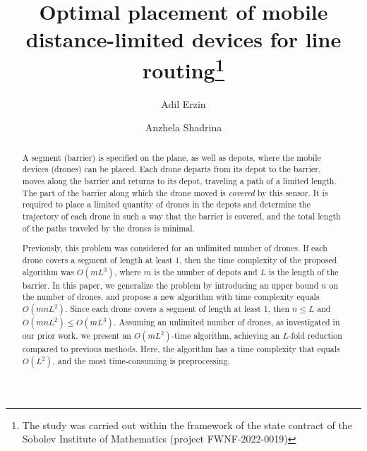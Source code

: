 \documentclass[runningheads]{llncs}
\begin{document}
%
\title{Optimal placement of mobile distance-limited devices for line routing\thanks{The study was carried out within the framework of the state contract of the Sobolev Institute of Mathematics (project FWNF-2022-0019)}}
%
\author{Adil Erzin\and Anzhela Shadrina}
%
%
%
\maketitle              %
%
\begin{abstract}
 A segment (barrier) is specified on the plane, as well as depots, where the mobile devices (drones) can be placed. Each drone departs from its depot to the barrier, moves along the barrier and returns to its depot, traveling a path of a limited length. The part of the barrier along which the drone moved is \emph{covered} by this sensor. It is required to place a limited quantity of drones in the depots and determine the trajectory of each drone in such a way that the barrier is covered, and the total length of the paths traveled by the drones is minimal.

 Previously, this problem was considered for an unlimited number of drones. If each drone covers a segment of length at least 1, then the time complexity of the proposed algorithm was $O(mL^3)$, where $m$ is the number of depots and $L$ is the length of the barrier. In this paper, we generalize the problem by introducing an upper bound $n$ on the number of drones, and propose a new algorithm with time complexity equals $O(mnL^2)$. Since each drone covers a segment of length at least 1, then $n\leq L$ and $O(mnL^2)\leq O(mL^3)$. Assuming an unlimited number of drones, as investigated in our prior work, we present an $O(mL^2)$-time algorithm, achieving an $L$-fold reduction compared to previous methods. Here, the algorithm has a time complexity that equals $O(L^2)$, and the most time-consuming is preprocessing.
\end{abstract}
%
\end{document}

